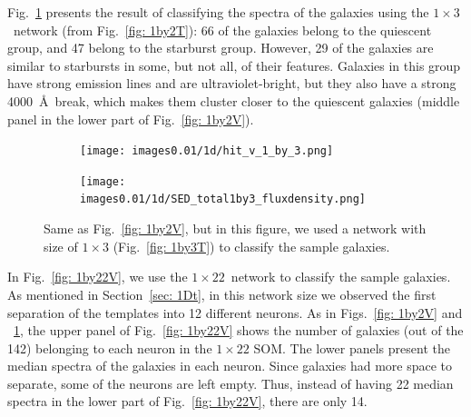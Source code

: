             Fig.~\ref{fig: 1by3V} presents the result of classifying the spectra of the galaxies using the $1\times3$~network (from Fig.~\ref{fig: 1by2T}): 66 of the galaxies belong to the quiescent group, and 47 belong to the starburst group. 
            However, 29 of the galaxies are similar to starbursts in some, but not all, of their features. 
            Galaxies in this group have strong emission lines and are ultraviolet-bright, but they also have a strong 4000~\AA~break, which makes them cluster closer to the quiescent galaxies (middle panel in the lower part of Fig.~\ref{fig: 1by2V}).

            \begin{figure}
                \begin{subfigure}[b]{0.5\textwidth}
                    \centering
                    \texttt{[image: images0.01/1d/hit\_v\_1\_by\_3.png]}
                \end{subfigure}
                \hfill
                \begin{subfigure}[b]{0.5\textwidth}
                     \texttt{[image: images0.01/1d/SED\_total1by3\_fluxdensity.png]}
                \end{subfigure}
                \caption[Classification of fitted galaxy SEDs from \citet{Hossein12} using the $1\times3$~networks]{Same as Fig.~\ref{fig: 1by2V}, but in this figure, we used a network with size of $1\times3$ (Fig.~\ref{fig: 1by3T}) to classify the sample galaxies.}
                \label{fig: 1by3V}
            \end{figure}       
            
            In Fig.~\ref{fig: 1by22V}, we use the $1\times22$~network to classify the sample galaxies.
            As mentioned in Section~\ref{sec: 1Dt}, in this network size we observed the first separation of the  templates into 12 different neurons.
            As in Figs.~\ref{fig: 1by2V} and ~\ref{fig: 1by3V}, the upper panel of Fig.~\ref{fig: 1by22V} shows the number of galaxies (out of the 142) belonging to each neuron in the $1\times22$ SOM.
            The lower panels present the median spectra of the galaxies in each neuron.
            Since galaxies had more space to separate, some of the neurons are left empty.
            Thus, instead of having 22 median spectra in the lower part of Fig.~\ref{fig: 1by22V}, there are only 14.

